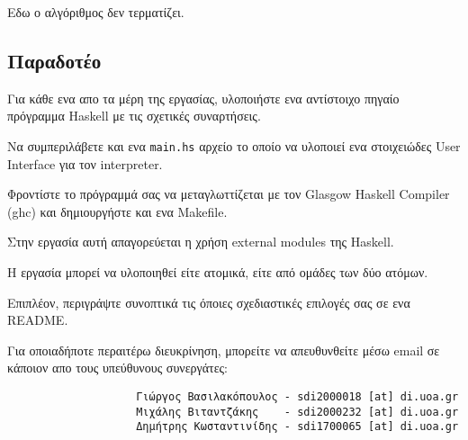\documentclass[10pt]{article}
\begin{document}
Εδω ο αλγόριθμος δεν τερματίζει.

\subsection*{Παραδοτέο}

Για κάθε ενα απο τα μέρη της εργασίας, υλοποιήστε ενα αντίστοιχο πηγαίο πρόγραμμα Haskell με τις σχετικές συναρτήσεις. \

Να συμπεριλάβετε και ενα \verb|main.hs| αρχείο το οποίο να υλοποιεί ενα στοιχειώδες User Interface για τον interpreter.\

Φροντίστε το πρόγραμμά σας να μεταγλωττίζεται με τον Glasgow Haskell Compiler (ghc) και δημιουργήστε και ενα Makefile.\

Στην εργασία αυτή απαγορεύεται η χρήση external modules της Haskell.\

Η εργασία μπορεί να υλοποιηθεί είτε ατομικά, είτε από ομάδες των δύο ατόμων.\

Επιπλέον, περιγράψτε συνοπτικά τις όποιες σχεδιαστικές επιλογές σας σε ενα README.\

Για οποιαδήποτε περαιτέρω διευκρίνηση, μπορείτε να απευθυνθείτε μέσω email σε κάποιον απο τους υπεύθυνους συνεργάτες:

\begin{verbatim}
                    Γιώργος Βασιλακόπουλος - sdi2000018 [at] di.uoa.gr  
                    Μιχάλης Βιταντζάκης    - sdi2000232 [at] di.uoa.gr 
                    Δημήτρης Κωσταντινίδης - sdi1700065 [at] di.uoa.gr
\end{verbatim}
\end{document}

